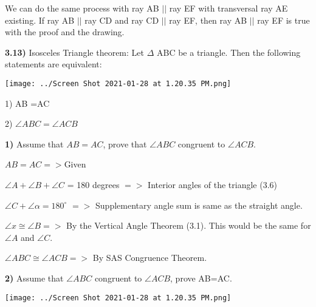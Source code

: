 \documentclass{article}
\begin{document}
We can do the same process with ray AB $||$ ray EF  with transversal ray AE existing. If ray AB $ || $ ray CD and ray CD $|| $ ray EF, then ray  AB $|| $ ray EF is true with the proof and the drawing.






\newpage
\textbf{3.13)} Isosceles Triangle theorem: Let $\Delta$ ABC be a triangle. Then the following statements are equivalent: 

\texttt{[image: ../Screen Shot 2021-01-28 at 1.20.35 PM.png]} 

\vspace{2mm}

1) AB =AC

2) $\angle{ABC} = \angle{ACB}$

\vspace{2mm}
\vspace{2mm}

	\textbf{1)} Assume that $AB=AC$, prove that $\angle ABC$ congruent to $\angle ACB$.

\vspace{2mm}

$AB=AC => $Given

\vspace{2mm}

$\angle A + \angle B + \angle C$ = 180 degrees $=>$ Interior angles of the triangle (3.6)

\vspace{2mm}

$\angle{C} + \angle{\alpha } =180^{\circ}$ $= > $ Supplementary angle sum is same as the straight angle.

\vspace{2mm}

$\angle{x} \displaystyle \cong \angle{B}  = > $ By the Vertical Angle Theorem (3.1). This would be the same for $\angle{A}$ and $\angle{C}$.

\vspace{2mm}

$\angle{ABC} \displaystyle \cong \angle{ACB} =>$ By SAS Congruence Theorem.


\newpage

\textbf{2)} Assume that $\angle ABC$ congruent to $\angle ACB$, prove AB=AC.

\texttt{[image: ../Screen Shot 2021-01-28 at 1.20.35 PM.png]} 

\vspace{2mm}
\end{document}
